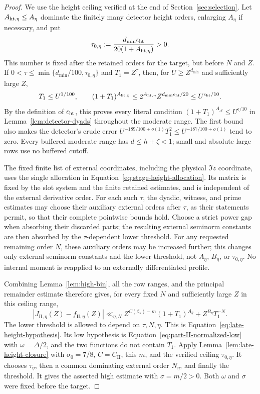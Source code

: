 \documentclass[11pt,a4paper]{article}
\numberwithin{equation}{section}
\numberwithin{figure}{section}
\theoremstyle{definition}
\theoremstyle{remark}
\begin{document}
\begin{proof}
We use the height ceiling verified at the end of
Section~\ref{sec:selection}.  Let \(A_{{\rm ht},\eta}\le A_\eta\)
dominate the finitely many detector height orders, enlarging \(A_\eta\)
if necessary, and put
\[
 \tau_{0,\eta}:=
       \frac{d_{\min}\epsilon_{\rm ht}}{20(1+A_{{\rm ht},\eta})}>0.
\]
This number is fixed after the retained orders for the target, but before
\(N\) and \(Z\).  If
\(0<\tau\le\min\{d_{\min}/100,\tau_{0,\eta}\}\) and \(T_1=Z^\tau\),
then, for \(U\ge Z^{d_{\min}}\) and sufficiently large \(Z\),
\[
 T_1\le U^{1/100},\qquad
 (1+T_1)^{A_{{\rm ht},\eta}}
 \le2^{A_{{\rm ht},\eta}}Z^{d_{\min}\epsilon_{\rm ht}/20}
 \le U^{\epsilon_{\rm ht}/10}.
\]
By the definition of \(\epsilon_{\rm ht}\), this proves every literal
condition \((1+T_1)^{A_{\mathcal A}}\le U^{\epsilon/10}\) in
Lemma~\ref{lem:detector-dyads} throughout the moderate range.  The first
bound also
makes the detector's crude error
\(U^{-189/100+o(1)}T_1^2\le U^{-187/100+o(1)}\) tend to zero.
Every buffered moderate range has \(d\le h+\zeta<1\); small and
absolute large rows use no buffered cutoff.

The fixed finite list of external coordinates, including the physical
\(\Im z\) coordinate, uses the single allocation in
Equation~\eqref{eq:stage-height-allocation}.  Its matrix is fixed by the
slot system and the finite retained estimates, and is independent of the
external derivative order.  For each such \(\tau\), the dyadic, witness,
and prime estimates may choose their auxiliary external orders after
\(\tau\), as their statements permit, so that their complete pointwise
bounds hold.  Choose a strict power gap when absorbing their discarded
parts; the resulting external seminorm constants are then absorbed by the
\(\tau\)-dependent lower threshold.  For any requested remaining order
\(N\), these auxiliary
orders may be increased further; this changes only external seminorm
constants and the lower threshold, not \(A_\eta\), \(B_\eta\), or
\(\tau_{0,\eta}\).  No internal moment is reapplied to an externally
differentiated profile.

Combining Lemma~\ref{lem:high-bin}, all the row ranges, and the principal
remainder estimate therefore gives, for every fixed \(N\) and sufficiently
large \(Z\) in this ceiling range,
\[
 |J_{\mathrm{II},\eta}(Z)-f_{\mathrm{II},\eta}(Z)|
 \ll_{\eta,N}
 Z^{C(\beta_*)-m}(1+T_1)^{A_\eta}
       +Z^{B_\eta}T_1^{-N}.
\]
The lower threshold is allowed to depend on \(\tau,N,\eta\).
This is Equation~\eqref{eq:late-height-hypothesis}.
Its low hypothesis is Equation~\eqref{eq:part-II-normalized-low}
with \(\omega=\Delta/2\), and the two functions do not contain \(T_1\).
Apply Lemma~\ref{lem:late-height-closure} with
\(\sigma_0=7/8\), \(C=C_{\mathrm{II}}\), this \(m\), and the verified
ceiling \(\tau_{0,\eta}\).  It chooses \(\tau_\eta\), then a common
dominating external order \(N_\eta\), and finally the threshold.
It gives the asserted high estimate with \(\sigma=m/2>0\).
Both \(\omega\) and \(\sigma\) were fixed before the target.
\end{proof}
\end{document}
